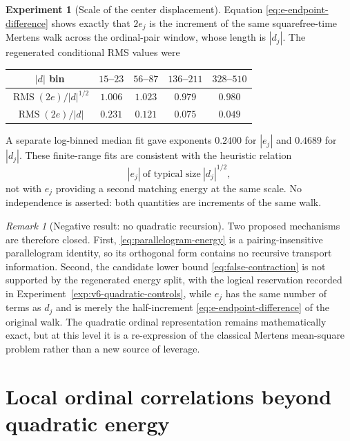 \documentclass[11pt]{amsart}
\numberwithin{equation}{section}
\theoremstyle{plain}
\theoremstyle{definition}
\newtheorem{experiment}[theorem]{Experiment}
\theoremstyle{remark}
\newtheorem{remark}[theorem]{Remark}
\begin{document}
\begin{experiment}[Scale of the center displacement]
\label{exp:v6-center-scale}
Equation \eqref{eq:e-endpoint-difference} shows exactly that $2e_j$ is the
increment of the same squarefree-time Mertens walk across the ordinal-pair
window, whose length is $|d_j|$.  The regenerated conditional RMS values were
\begin{center}
\begin{tabular}{@{}ccccc@{}}
\toprule
$|d|$ bin & $15$--$23$ & $56$--$87$ & $136$--$211$ & $328$--$510$\\
\midrule
$\operatorname{RMS}(2e)/|d|^{1/2}$
& $1.006$ & $1.023$ & $0.979$ & $0.980$\\
$\operatorname{RMS}(2e)/|d|$
& $0.231$ & $0.121$ & $0.075$ & $0.049$\\
\bottomrule
\end{tabular}
\end{center}
A separate log-binned median fit gave exponents $0.2400$ for $|e_j|$ and
$0.4689$ for $|d_j|$.  These finite-range fits are consistent with
the heuristic relation
\begin{equation}
\label{eq:e-sqrt-d-heuristic}
|e_j|\ \text{of typical size}\ |d_j|^{1/2},
\end{equation}
not with $e_j$ providing a second matching energy at the same scale.  No
independence is asserted: both quantities are increments of the same walk.
\end{experiment}

\begin{remark}[Negative result: no quadratic recursion]
\label{rem:no-quadratic-recursion}
Two proposed mechanisms are therefore closed.  First,
\eqref{eq:parallelogram-energy} is a pairing-insensitive parallelogram identity,
so its orthogonal form contains no recursive transport information.  Second,
the candidate lower bound \eqref{eq:false-contraction} is not supported by the
regenerated energy split, with the logical reservation recorded in
Experiment~\ref{exp:v6-quadratic-controls}, while $e_j$ has the same number of terms as $d_j$ and
is merely the half-increment \eqref{eq:e-endpoint-difference} of the original
walk.  The quadratic ordinal representation remains mathematically exact, but
at this level it is a re-expression of the classical Mertens mean-square
problem rather than a new source of leverage.
\end{remark}



\section{Local ordinal correlations beyond quadratic energy}
\label{sec:ordinal-local}
\end{document}

